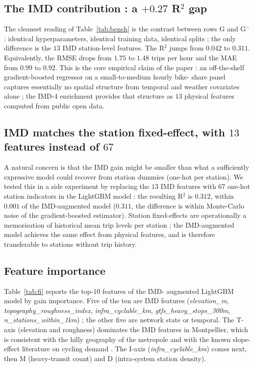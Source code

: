\documentclass[11pt,a4paper]{article}
\begin{document}
\subsection{The IMD contribution : a $+0.27$ R$^2$ gap}

The cleanest reading of Table~\ref{tab:bench} is the contrast
between rows G and G$^-$ : identical hyperparameters, identical
training data, identical splits ; the only difference is the $13$
IMD station-level features.  The R$^{2}$ jumps from $0.042$ to
$0.311$.  Equivalently, the RMSE drops from $1.75$ to $1.48$
trips per hour and the MAE from $0.99$ to $0.92$.  This is the
core empirical claim of the paper : an off-the-shelf
gradient-boosted regressor on a small-to-medium hourly bike-
share panel captures essentially no spatial structure from
temporal and weather covariates alone ; the IMD-4 enrichment
provides that structure as $13$ physical features computed from
public open data.

\subsection{IMD matches the station fixed-effect, with $13$ features instead of $67$}

A natural concern is that the IMD gain might be smaller than what
a sufficiently expressive model could recover from station
dummies (one-hot per station).  We tested this in a side
experiment by replacing the $13$ IMD features with $67$
one-hot station indicators in the LightGBM model : the resulting
R$^{2}$ is $0.312$, within $0.001$ of the IMD-augmented model
($0.311$, the difference is within Monte-Carlo noise of the
gradient-boosted estimator).  Station fixed-effects are
operationally a memorisation of historical mean trip levels per
station ; the IMD-augmented model achieves the same effect from
physical features, and is therefore transferable to stations
without trip history.

\subsection{Feature importance}

Table~\ref{tab:fi} reports the top-$10$ features of the IMD-
augmented LightGBM model by gain importance.  Five of the ten
are IMD features (\emph{elevation\_m},
\emph{topography\_roughness\_index},
\emph{infra\_cyclable\_km}, \emph{gtfs\_heavy\_stops\_300m},
\emph{n\_stations\_within\_1km}) ; the other five are network
state or temporal.  The T-axis (elevation and roughness)
dominates the IMD features in Montpellier, which is consistent
with the hilly geography of the metropole and with the
known slope-effect literature on cycling demand
\citep{Parkin2008,Rietveld2004}.  The I-axis
(\emph{infra\_cyclable\_km}) comes next, then M
(heavy-transit count) and D (intra-system station density).
\end{document}
